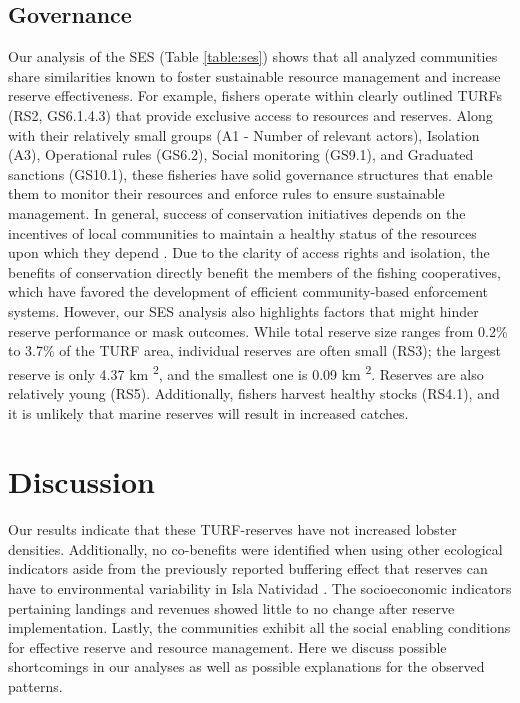 \documentclass{frontiersSCNS}
\begin{document}
\hypertarget{governance}{%
\subsection{Governance}\label{governance}}

Our analysis of the SES (Table \ref{table:ses}) shows that all analyzed
communities share similarities known to foster sustainable resource
management and increase reserve effectiveness. For example, fishers
operate within clearly outlined TURFs (RS2, GS6.1.4.3) that provide
exclusive access to resources and reserves. Along with their relatively
small groups (A1 - Number of relevant actors), Isolation (A3),
Operational rules (GS6.2), Social monitoring (GS9.1), and Graduated
sanctions (GS10.1), these fisheries have solid governance structures
that enable them to monitor their resources and enforce rules to ensure
sustainable management. In general, success of conservation initiatives
depends on the incentives of local communities to maintain a healthy
status of the resources upon which they depend \citep{jupiter_2017}. Due
to the clarity of access rights and isolation, the benefits of
conservation directly benefit the members of the fishing cooperatives,
which have favored the development of efficient community-based
enforcement systems. However, our SES analysis also highlights factors
that might hinder reserve performance or mask outcomes. While total
reserve size ranges from 0.2\% to 3.7\% of the TURF area, individual
reserves are often small (RS3); the largest reserve is only 4.37 km
\textsuperscript{2}, and the smallest one is 0.09 km
\textsuperscript{2}. Reserves are also relatively young (RS5).
Additionally, fishers harvest healthy stocks (RS4.1), and it is unlikely
that marine reserves will result in increased catches.

\hypertarget{discussion}{%
\section{Discussion}\label{discussion}}

Our results indicate that these TURF-reserves have not increased lobster
densities. Additionally, no co-benefits were identified when using other
ecological indicators aside from the previously reported buffering
effect that reserves can have to environmental variability in Isla
Natividad \citep{micheli_2012-EU}. The socioeconomic indicators
pertaining landings and revenues showed little to no change after
reserve implementation. Lastly, the communities exhibit all the social
enabling conditions for effective reserve and resource management. Here
we discuss possible shortcomings in our analyses as well as possible
explanations for the observed patterns.
\end{document}
